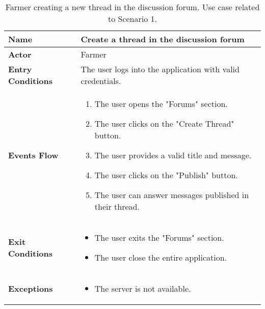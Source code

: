 \begin{table}[hbt!]
\centering
\small
\caption{\label{tab:farmerNewThread}Farmer creating a new thread in the discussion forum. Use case related to Scenario 1.}
\renewcommand{\arraystretch}{1.25}
\begin{tabular}{|l|>{\raggedright\arraybackslash}m{12cm}|}
    \hline
    \textbf{Name} & Create a thread in the discussion forum\\
    \hline
   	\textbf{Actor} & Farmer\\
    \hline
    \textbf{Entry Conditions} & The user logs into the application with valid credentials.\\
    \hline
    \textbf{Events Flow} & 
    		\begin{enumerate}
    			\item The user opens the "Forums" section.
    			\item The user clicks on the "Create Thread" button.
    			\item The user provides a valid title and message.
    			\item The user clicks on the "Publish" button.
    			\item The user can answer messages published in their thread.
    		\end{enumerate}
    	\\
    \hline
    \textbf{Exit Conditions} & \begin{itemize}
    	\item The user exits the "Forums" section.
    	\item The user close the entire application.    
    	\end{itemize}
	\\
    \hline
    \textbf{Exceptions} & 
    		\begin{itemize}
    			\item The server is not available.
    		\end{itemize}
    	\\
    \hline
\end{tabular}
\end{table}